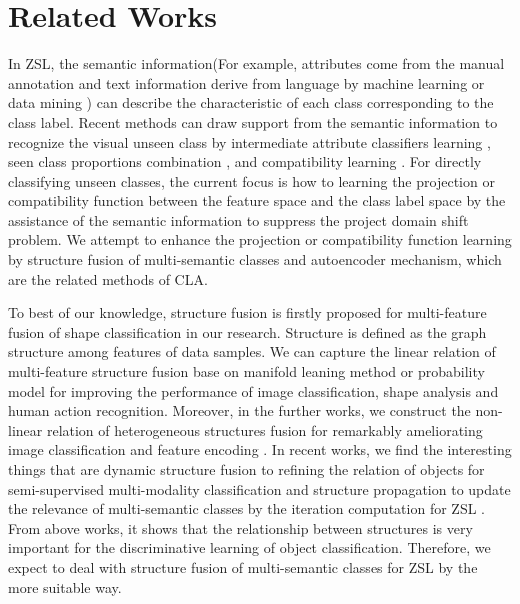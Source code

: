 \documentclass[review]{elsarticle}
\begin{document}
\section{Related Works}
In ZSL, the semantic information(For example, attributes \cite{lampert2009learning} come from the manual annotation \cite{Akata2013Label}and text information \cite{Socher2013Zero} derive from language by machine learning \cite{Yu2013Designing} or data mining \cite{Elhoseiny2013Write}) can describe the characteristic of each class corresponding to the class label. Recent methods can draw support from the semantic information to recognize the visual unseen class by intermediate attribute classifiers learning \cite{Rohrbach2010What} \cite{Rohrbach2011Evaluating} \cite{Lampert2014}, seen class proportions combination \cite{zhang2015zero} \cite{7781018} \cite{norouzi2013zero} \cite{Changpinyo2016}, and compatibility learning \cite{Akata2016Label} \cite{7298911} \cite{Frome2013DeViSE} \cite{Socher2013Zero} \cite{romera2015embarrassingly} \cite{7780384}. For directly classifying unseen classes, the current focus is how to learning the projection or compatibility function between the feature space and the class label space by the assistance of the semantic information to suppress the project domain shift problem. We attempt to enhance the projection or compatibility function learning by structure fusion of multi-semantic classes and autoencoder mechanism, which are the related methods of CLA.

To best of our knowledge, structure fusion is firstly proposed for multi-feature fusion of shape classification \cite{Lin20131286} in our research. Structure is defined as the graph structure among features of data samples. We can capture the linear relation of multi-feature structure fusion base on manifold leaning method \cite{Lin20131286} \cite{Lin2014146} or probability model \cite{7268821} for improving the performance of image classification, shape analysis and human action recognition. Moreover, in the further works, we construct the non-linear relation of heterogeneous structures fusion for remarkably ameliorating image classification \cite{7301305} \cite{Lin20161} and feature encoding \cite{Lin2017275}. In recent works, we find the interesting things that are dynamic structure fusion to refining the relation of objects for semi-supervised multi-modality classification \cite{Lin2017Dynamic} and structure propagation to update the relevance of multi-semantic classes by the iteration computation for ZSL \cite{Lin2018structure}. From above works, it shows that the relationship between structures is very important for the discriminative learning of object classification. Therefore, we expect to deal with structure fusion of multi-semantic classes for ZSL by the more suitable way.
\end{document}
